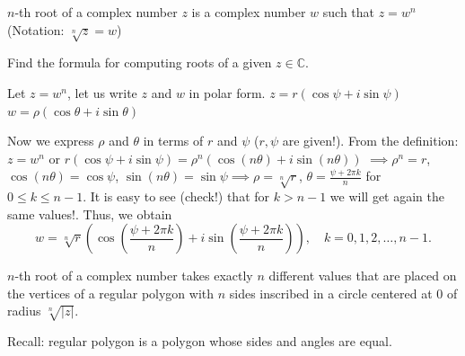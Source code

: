 \begin{definition}
$n$-th root of a complex number $z$ is a complex number $w$ such that $z = w^n$ (Notation: $\sqrt[n]{z} = w$)
\end{definition}

\begin{example}
Find the formula for computing roots of a given $z \in \mathbb{C}$.

\begin{soln}  Let $z=w^n$, let us write $z$ and $w$ in polar form.
$z = r(\cos\psi + i\sin\psi)$
$w = \rho(\cos\theta + i\sin\theta)$

Now we express $\rho$ and $\theta$ in terms of $r$ and $\psi$ ($r, \psi$ are given!).
From the definition: $z=w^n$ or $r(\cos\psi + i\sin\psi) = \rho^n(\cos(n\theta) + i\sin(n\theta))$
$\implies \rho^n = r$, $\cos(n\theta) = \cos\psi$, $\sin(n\theta) = \sin\psi \implies \rho = \sqrt[n]{r}$, $\theta = \frac{\psi + 2\pi k}{n}$ for $0\leq k \leq n-1$.
It is easy to see (check!) that for $k>n-1$ we will get again the same values!. Thus, we obtain
\begin{equation}\label{equation:244.1}
    w = \sqrt[n]{r}(\cos(\frac{\psi + 2\pi k}{n}) + i\sin(\frac{\psi + 2\pi k}{n})), \quad k=0,1,2,\ldots,n-1. \tag{**}
\end{equation}
\end{soln}
\end{example}

\begin{corollary}
$n$-th root of a complex number takes exactly $n$ different values that are placed on the vertices of a regular polygon with $n$ sides inscribed in a circle centered at 0 of radius $\sqrt[n]{\lvert z\rvert}$.
\end{corollary}

Recall: regular polygon is a polygon whose sides and angles are equal.

